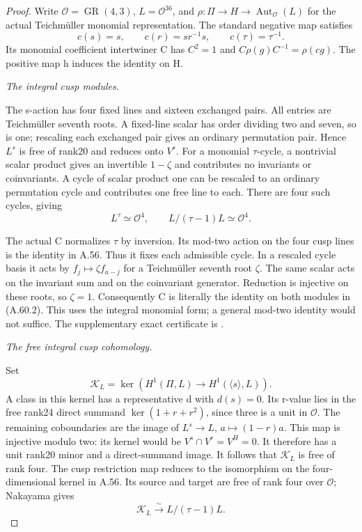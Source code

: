 \begin{proof}
Write \(\mathcal O=\operatorname{GR}(4,3)\),
\(L=\mathcal O^{36}\), and
\(\rho:\Pi\to H\to\operatorname{Aut}_{\mathcal O}(L)\)
for the actual Teichm\"uller monomial representation. The
standard negative map satisfies
\[
 c(s)=s,\qquad c(r)=sr^{-1}s,\qquad c(\tau)=\tau^{-1}.
 \tag{A.60.1}
\]
Its monomial coefficient intertwiner C has
\(C^2=1\) and \(C\rho(g)C^{-1}=\rho(cg)\).
The positive map h induces the identity on H.

\emph{The integral cusp modules.}\par
The s-action has four fixed lines and sixteen exchanged pairs.
All entries are Teichm\"uller seventh roots. A fixed-line scalar
has order dividing two and seven, so is one; rescaling each
exchanged pair gives an ordinary permutation pair. Hence
\(L^s\) is free of rank20 and reduces onto \(V^s\).
For a monomial \(\tau\)-cycle, a nontrivial scalar product
gives an invertible \(1-\zeta\) and contributes no invariants
or coinvariants. A cycle of scalar product one can be rescaled
to an ordinary permutation cycle and contributes one free line
to each. There are four such cycles, giving
\[
 L^\tau\simeq\mathcal O^4,
 \qquad L/(\tau-1)L\simeq\mathcal O^4.
 \tag{A.60.2}
\]

The actual C normalizes \(\tau\) by inversion. Its mod-two
action on the four cusp lines is the identity in A.56. Thus it
fixes each admissible cycle. In a rescaled cycle basis it acts
by \(f_j\mapsto\zeta f_{a-j}\) for a Teichm\"uller seventh
root \(\zeta\). The same scalar acts on the invariant sum and
on the coinvariant generator. Reduction is injective on these
roots, so \(\zeta=1\). Consequently C is literally the
identity on both modules in (A.60.2). This uses the integral
monomial form; a general mod-two identity would not suffice.
The supplementary exact certificate is
.

\emph{The free integral cusp cohomology.}\par
Set
\[
 \mathcal K_L=
 \ker\!\left(H^1(\Pi,L)\longrightarrow H^1(\langle s\rangle,L)\right).
 \tag{A.60.3}
\]
A class in this kernel has a representative d with \(d(s)=0\).
Its r-value lies in the free rank24 direct summand
\(\ker(1+r+r^2)\), since three is a unit in \(\mathcal O\).
The remaining coboundaries are the image of
\(L^s\to L\), \(a\mapsto(1-r)a\). This map is injective
modulo two: its kernel would be \(V^s\cap V^r=V^H=0\).
It therefore has a unit rank20 minor and a direct-summand
image. It follows that \(\mathcal K_L\) is free of rank four.
The cusp restriction map reduces to the isomorphism on the
four-dimensional kernel in A.56. Its source and target are
free of rank four over \(\mathcal O\); Nakayama gives
\[
 \mathcal K_L\xrightarrow{\ \sim\ }L/(\tau-1)L.
 \tag{A.60.4}
\]


\end{proof}

